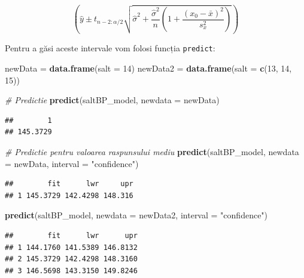 \documentclass[]{article}
\newenvironment{Shaded}{\begin{snugshade}}{\end{snugshade}}
\newcommand{\KeywordTok}[1]{\textcolor[rgb]{0.13,0.29,0.53}{\textbf{{#1}}}}
\newcommand{\DataTypeTok}[1]{\textcolor[rgb]{0.13,0.29,0.53}{{#1}}}
\newcommand{\DecValTok}[1]{\textcolor[rgb]{0.00,0.00,0.81}{{#1}}}
\newcommand{\StringTok}[1]{\textcolor[rgb]{0.31,0.60,0.02}{{#1}}}
\newcommand{\CommentTok}[1]{\textcolor[rgb]{0.56,0.35,0.01}{\textit{{#1}}}}
\newcommand{\NormalTok}[1]{{#1}}
\begin{document}
\[
\left(\hat y \pm t_{n-2:\alpha/2}\sqrt{\hat\sigma^2+\frac{\hat\sigma^2}{n}\left(1+\frac{(x_0-\bar x)^2}{s_x^2}\right)}\right)
\]

Pentru a găsi aceste intervale vom folosi funcția \texttt{predict}:

\begin{Shaded}
\begin{Highlighting}[]
\NormalTok{newData =}\StringTok{ }\KeywordTok{data.frame}\NormalTok{(}\DataTypeTok{salt =} \DecValTok{14}\NormalTok{)}
\NormalTok{newData2 =}\StringTok{ }\KeywordTok{data.frame}\NormalTok{(}\DataTypeTok{salt =} \KeywordTok{c}\NormalTok{(}\DecValTok{13}\NormalTok{, }\DecValTok{14}\NormalTok{, }\DecValTok{15}\NormalTok{))}

\CommentTok{# Predictie}
\KeywordTok{predict}\NormalTok{(saltBP_model, }\DataTypeTok{newdata =} \NormalTok{newData)}
\end{Highlighting}
\end{Shaded}

\begin{verbatim}
##        1 
## 145.3729
\end{verbatim}

\begin{Shaded}
\begin{Highlighting}[]
\CommentTok{# Predictie pentru valoarea raspunsului mediu}
\KeywordTok{predict}\NormalTok{(saltBP_model, }\DataTypeTok{newdata =} \NormalTok{newData, }\DataTypeTok{interval =} \StringTok{"confidence"}\NormalTok{)}
\end{Highlighting}
\end{Shaded}

\begin{verbatim}
##        fit      lwr     upr
## 1 145.3729 142.4298 148.316
\end{verbatim}

\begin{Shaded}
\begin{Highlighting}[]
\KeywordTok{predict}\NormalTok{(saltBP_model, }\DataTypeTok{newdata =} \NormalTok{newData2, }\DataTypeTok{interval =} \StringTok{"confidence"}\NormalTok{)}
\end{Highlighting}
\end{Shaded}

\begin{verbatim}
##        fit      lwr      upr
## 1 144.1760 141.5389 146.8132
## 2 145.3729 142.4298 148.3160
## 3 146.5698 143.3150 149.8246
\end{verbatim}
\end{document}
